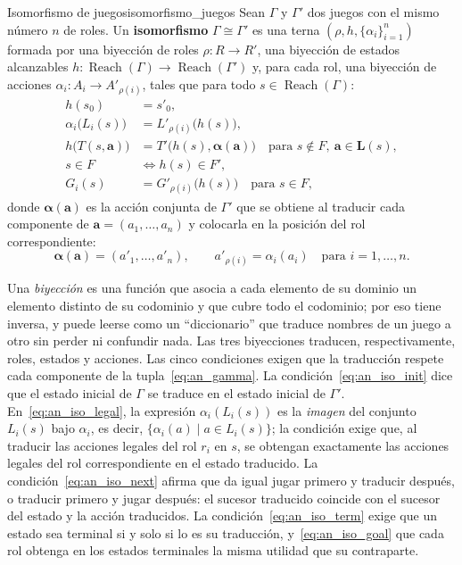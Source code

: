 \begin{definicion}{Isomorfismo de juegos}{isomorfismo_juegos}
Sean $\Gamma$ y $\Gamma'$ dos juegos con el mismo número $n$ de roles. Un \textbf{isomorfismo} $\Gamma \cong \Gamma'$ es una terna $(\rho, h, \{\alpha_i\}_{i=1}^n)$ formada por una biyección de roles $\rho : R \to R'$, una biyección de estados alcanzables $h : \operatorname{Reach}(\Gamma) \to \operatorname{Reach}(\Gamma')$ y, para cada rol, una biyección de acciones $\alpha_i : A_i \to A'_{\rho(i)}$, tales que para todo $s \in \operatorname{Reach}(\Gamma)$:
\begin{align}
    h(s_0) &= s'_0, \label{eq:an_iso_init}\\
    \alpha_i\big(L_i(s)\big) &= L'_{\rho(i)}\big(h(s)\big), \label{eq:an_iso_legal}\\
    h\big(T(s,\mathbf a)\big) &= T'\big(h(s), \boldsymbol\alpha(\mathbf a)\big) \quad \text{para } s \notin F,\ \mathbf a \in \mathbf L(s), \label{eq:an_iso_next}\\
    s \in F &\iff h(s) \in F', \label{eq:an_iso_term}\\
    G_i(s) &= G'_{\rho(i)}\big(h(s)\big) \quad \text{para } s \in F, \label{eq:an_iso_goal}
\end{align}
donde $\boldsymbol\alpha(\mathbf a)$ es la acción conjunta de $\Gamma'$ que se obtiene al traducir cada componente de $\mathbf a = (a_1, \dots, a_n)$ y colocarla en la posición del rol correspondiente:
\begin{equation}
    \boldsymbol\alpha(\mathbf a) = (a'_1, \dots, a'_n), \qquad a'_{\rho(i)} = \alpha_i(a_i) \quad \text{para } i = 1, \dots, n.
    \label{eq:an_alpha_conjunta}
\end{equation}
\end{definicion}

Una \emph{biyección} es una función que asocia a cada elemento de su dominio un elemento distinto de su codominio y que cubre todo el codominio; por eso tiene inversa, y puede leerse como un ``diccionario'' que traduce nombres de un juego a otro sin perder ni confundir nada. Las tres biyecciones traducen, respectivamente, roles, estados y acciones. Las cinco condiciones exigen que la traducción respete cada componente de la tupla~\eqref{eq:an_gamma}. La condición~\eqref{eq:an_iso_init} dice que el estado inicial de $\Gamma$ se traduce en el estado inicial de $\Gamma'$. En~\eqref{eq:an_iso_legal}, la expresión $\alpha_i(L_i(s))$ es la \emph{imagen} del conjunto $L_i(s)$ bajo $\alpha_i$, es decir, $\{\alpha_i(a) \mid a \in L_i(s)\}$; la condición exige que, al traducir las acciones legales del rol $r_i$ en $s$, se obtengan exactamente las acciones legales del rol correspondiente en el estado traducido. La condición~\eqref{eq:an_iso_next} afirma que da igual jugar primero y traducir después, o traducir primero y jugar después: el sucesor traducido coincide con el sucesor del estado y la acción traducidos. La condición~\eqref{eq:an_iso_term} exige que un estado sea terminal si y solo si lo es su traducción, y~\eqref{eq:an_iso_goal} que cada rol obtenga en los estados terminales la misma utilidad que su contraparte.

